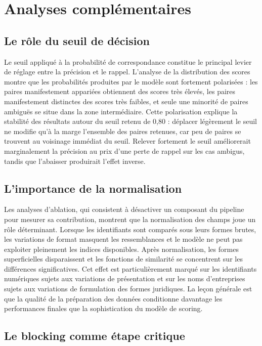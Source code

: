 \section{Analyses complémentaires}

\subsection{Le rôle du seuil de décision}

Le seuil appliqué à la probabilité de correspondance constitue le principal levier de réglage entre la précision et le rappel. L'analyse de la distribution des scores montre que les probabilités produites par le modèle sont fortement polarisées : les paires manifestement appariées obtiennent des scores très élevés, les paires manifestement distinctes des scores très faibles, et seule une minorité de paires ambiguës se situe dans la zone intermédiaire. Cette polarisation explique la stabilité des résultats autour du seuil retenu de 0,80 : déplacer légèrement le seuil ne modifie qu'à la marge l'ensemble des paires retenues, car peu de paires se trouvent au voisinage immédiat du seuil. Relever fortement le seuil améliorerait marginalement la précision au prix d'une perte de rappel sur les cas ambigus, tandis que l'abaisser produirait l'effet inverse.

\subsection{L'importance de la normalisation}

Les analyses d'ablation, qui consistent à désactiver un composant du pipeline pour mesurer sa contribution, montrent que la normalisation des champs joue un rôle déterminant. Lorsque les identifiants sont comparés sous leurs formes brutes, les variations de format masquent les ressemblances et le modèle ne peut pas exploiter pleinement les indices disponibles. Après normalisation, les formes superficielles disparaissent et les fonctions de similarité se concentrent sur les différences significatives. Cet effet est particulièrement marqué sur les identifiants numériques sujets aux variations de présentation et sur les noms d'entreprises sujets aux variations de formulation des formes juridiques. La leçon générale est que la qualité de la préparation des données conditionne davantage les performances finales que la sophistication du modèle de scoring.

\subsection{Le blocking comme étape critique}

